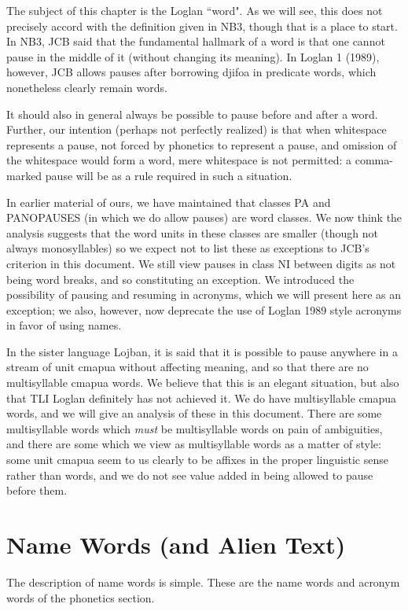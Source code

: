 \documentclass[12pt]{book}
\begin{document}
The subject of this chapter is the Loglan ``word".  As we will see, this does not precisely accord with the definition given in NB3, though that is a place to start.  In NB3, JCB said that the fundamental hallmark of a word is that one cannot pause in the middle of it (without changing its meaning).
In Loglan 1 (1989), however, JCB allows pauses after borrowing djifoa in predicate words, which nonetheless clearly remain words.

It should also in general always be possible to pause before and after a word.  Further, our intention (perhaps not perfectly realized) is that when whitespace represents a pause, not forced by phonetics to represent a pause, and omission of the whitespace would form a word, mere whitespace is not permitted:  a comma-marked pause will be as a rule required in such a situation.

In earlier material of ours, we have maintained that classes PA and PANOPAUSES (in which we do allow pauses) are word classes.  We now think the analysis suggests that the word units
in these classes are smaller (though not always monosyllables) so we expect not to list these as exceptions to JCB's criterion in this document.  We still view pauses in class NI between digits as not being word breaks, and so constituting an exception.  We introduced the possibility of pausing
and resuming in acronyms, which we will present here as an exception;  we also, however, now deprecate the use of Loglan 1989 style acronyms in favor of using names.

In the sister language Lojban, it is said that it is possible to pause anywhere in a stream of unit cmapua without affecting meaning, and so that there are no multisyllable cmapua words.
We believe that this is an elegant situation, but also that TLI Loglan definitely has not achieved it.  We do have multisyllable cmapua words, and we will give an analysis of these in this document.
There are some multisyllable words which {\em must\/} be multisyllable words on pain of ambiguities, and there are some which we view as multisyllable words as a matter of style:  some unit cmapua seem to us clearly to be affixes in the proper linguistic sense rather than words, and we do not see value added in being allowed to pause before them.

\section{Name Words (and Alien Text)}

The description of name words is simple.  These are the name words and acronym words of the phonetics section. 
\end{document}
